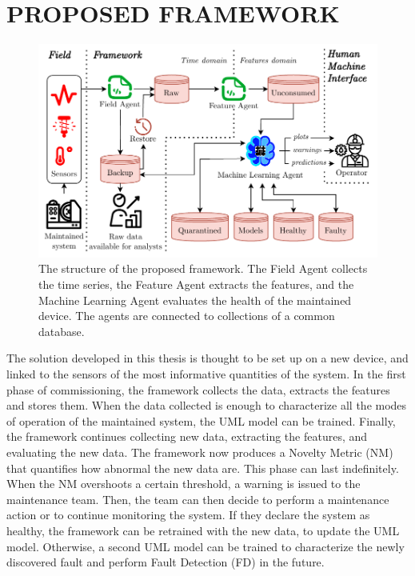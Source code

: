 \section{PROPOSED FRAMEWORK}
\label{sec:framework}
\begin{figure}
    \includegraphics[width=\linewidth]{images/Framework_structure.pdf}
    \caption{The structure of the proposed framework. The Field Agent collects the time series, the Feature Agent extracts the features, and the Machine Learning Agent evaluates the health of the maintained device. The agents are connected to collections of a common database.}
    \label{fig:framework_structure}
\end{figure}

The solution developed in this thesis is thought to be set up on a new device, and linked to the sensors of the most informative quantities of the system.
In the first phase of commissioning, the framework collects the data, extracts the features and stores them. When the data collected is enough to characterize all the modes of operation of the maintained system, the UML model can be trained. Finally, the framework continues collecting new data, extracting the features, and evaluating the new data. The framework now produces a Novelty Metric (NM) that quantifies how abnormal the new data are. 
This phase can last indefinitely. When the NM overshoots a certain threshold, a warning is issued to the maintenance team. 
Then, the team can then decide to perform a maintenance action or to continue monitoring the system. If they declare the system as healthy, the framework can be retrained with the new data, to update the UML model. Otherwise, a second UML model can be trained to characterize the newly discovered fault and perform Fault Detection (FD) in the future.

